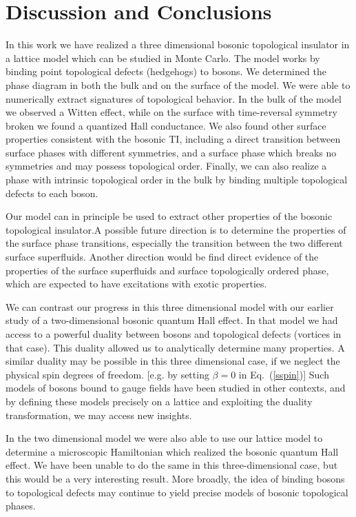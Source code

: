 \documentclass[prb,twocolumn]{revtex4-1}
\begin{document}
\section{Discussion and Conclusions}
In this work we have realized a three dimensional bosonic topological insulator in a lattice model which can be studied in Monte Carlo. The model works by binding point topological defects (hedgehogs) to bosons. We determined the phase diagram in both the bulk and on the surface of the model. We were able to numerically extract signatures of topological behavior. In the bulk of the model we observed a Witten effect, while on the surface with time-reversal symmetry broken we found a quantized Hall conductance. We also found other surface properties consistent with the bosonic TI, including a direct transition between surface phases with different symmetries, and a surface phase which breaks no symmetries and may possess topological order. Finally, we can also realize a phase with intrinsic topological order in the bulk by binding multiple topological defects to each boson.

Our model can in principle be used to extract other properties of the bosonic topological insulator.A possible future direction is to determine the properties of the surface phase transitions, especially the transition between the two different surface superfluids. Another direction would be find direct evidence of the properties of the surface superfluids and surface topologically ordered phase, which are expected to have excitations with exotic properties. 

We can contrast our progress in this three dimensional model with our earlier study of a two-dimensional bosonic quantum Hall effect. In that model we had access to a powerful duality between bosons and topological defects (vortices in that case). This duality allowed us to analytically determine many properties.  A similar duality may be possible in this three dimensional case, if we neglect the physical spin degrees of freedom. [e.g. by setting $\beta=0$ in Eq.~(\ref{sspin})] Such models of bosons bound to gauge fields have been studied in other contexts, and by defining these models precisely on a lattice and exploiting the duality transformation, we may access new insights.

In the two dimensional model we were also able to use our lattice model to determine a microscopic Hamiltonian which realized the bosonic quantum Hall effect. We have been unable to do the same in this three-dimensional case, but this would be a very interesting result. More broadly, the idea of binding bosons to topological defects may continue to yield precise models of bosonic topological phases.


\end{document}
